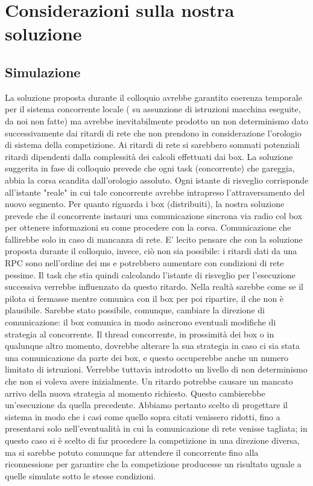 \section{Considerazioni sulla nostra soluzione}
\subsection{Simulazione}
La soluzione proposta durante il colloquio avrebbe garantito coerenza temporale per il sistema concorrente locale ( su assunzione di istruzioni macchina eseguite, da noi non fatte) ma avrebbe inevitabilmente prodotto un non determinismo dato successivamente dai ritardi di rete che non prendono in considerazione l’orologio di sistema della competizione. Ai ritardi di rete si sarebbero sommati potenziali ritardi dipendenti dalla complessità dei calcoli effettuati dai box. La soluzione suggerita in fase di colloquio prevede che ogni task (concorrente) che gareggia, abbia la corsa scandita dall’orologio assoluto. Ogni istante di risveglio corrisponde all’istante "reale" in cui tale concorrente avrebbe intrapreso l’attraversamento del nuovo segmento. Per quanto riguarda i box (distribuiti), la nostra soluzione prevede che il concorrente instauri una comunicazione sincrona via radio col box per ottenere informazioni su come procedere con la corsa. Comunicazione che fallirebbe solo in caso di mancanza di rete. E’ lecito pensare che con la soluzione proposta durante il colloquio, invece, ciò non sia possibile: i ritardi dati da una RPC sono nell’ordine dei ms e potrebbero aumentare con condizioni di rete pessime. Il task che stia quindi calcolando l’istante di risveglio per l’esecuzione successiva verrebbe influenzato da questo ritardo. Nella realtà sarebbe come se il pilota si fermasse mentre comunica con il box per poi ripartire, il che non è plausibile. Sarebbe stato possibile, comunque, cambiare la direzione di comunicazione: il box comunica in modo asincrono eventuali modifiche di strategia al concorrente. Il thread concorrente, in prossimità dei box o in qualunque altro momento, dovrebbe alterare la sua strategia in caso ci sia stata una comunicazione da parte dei box, e questo occuperebbe anche un numero limitato di istruzioni. Verrebbe tuttavia introdotto un livello di non determinismo che non si voleva avere inizialmente. Un ritardo potrebbe causare un mancato arrivo della nuova strategia al momento richiesto. Questo cambierebbe un'esecuzione da  quella precedente. Abbiamo pertanto scelto di progettare il sistema in modo che i casi come quello sopra citati venissero ridotti, fino a presentarsi solo nell'eventualità in cui la comunicazione di rete venisse tagliata; in questo caso si è scelto di far procedere la competizione in una direzione diversa, ma si sarebbe potuto comunque far attendere il concorrente fino alla riconnessione per garantire che la competizione producesse un risultato uguale a quelle simulate sotto le stesse condizioni.
